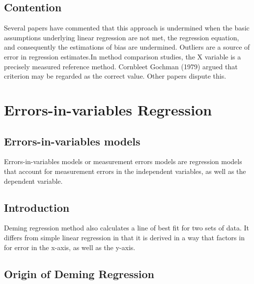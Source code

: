 \documentclass[12pt, a4paper]{report}
\theoremstyle{plain}
\theoremstyle{definition}
\theoremstyle{remark}
\begin{document}



	


\section{Contention }
Several papers have commented that this approach is undermined
when the basic assumptions underlying linear regression are not
met, the regression equation, and consequently the estimations of
bias are undermined. Outliers are a source of error in regression
estimates.In method comparison studies, the X variable is a
precisely measured reference method. Cornbleet Gochman (1979)
argued that criterion may be regarded as the correct value. Other
papers dispute this.







\chapter{Errors-in-variables Regression}





\section{Errors-in-variables models}
Errors-in-variables models or measurement errors models are regression models that account for measurement errors in the independent variables, as well as the dependent variable.



\section{Introduction}

Deming regression method also calculates a line of best fit for two sets of data. It differs from simple linear regression in that it is derived in a way that factors in for error in the x-axis, as
well as the y-axis.



\section{Origin of Deming Regression}
\end{document}
